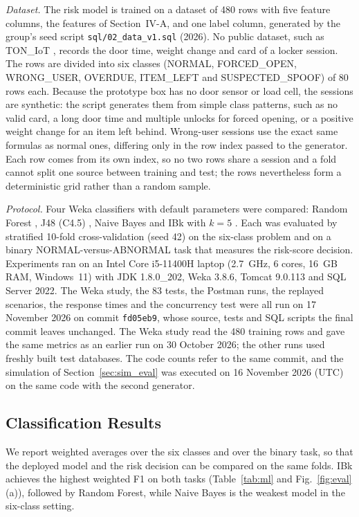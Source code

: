 \documentclass[journal,onecolumn]{IEEEtran}
\newcommand{\revisioncommit}{fd05eb9}
\begin{document}
\textit{Dataset.} The risk model is trained on a dataset of 480 rows with five feature columns, the features of
Section~IV-A, and one label column, generated by the group's seed script \texttt{sql/02\_data\_v1.sql} (2026). No
public dataset, such as TON\_IoT \cite{moustafa2021toniot}, records the door time, weight change and card of a locker
session. The rows are divided into six classes (NORMAL, FORCED\_OPEN,
WRONG\_USER, OVERDUE, ITEM\_LEFT and SUSPECTED\_SPOOF) of 80 rows each. Because the prototype box has no door sensor or
load cell, the sessions are synthetic: the script generates them from simple class patterns, such as no valid card, a
long door time and multiple unlocks for forced opening, or a positive weight change for an item left behind. Wrong-user
sessions use the exact same formulas as normal ones, differing only in the row index passed to the generator. Each
row comes from its own index, so no two rows share a session and a fold cannot split one source between training and
test; the rows nevertheless form a deterministic grid rather than a random sample.

\textit{Protocol.} Four Weka classifiers with default parameters were compared: Random Forest \cite{breiman2001rf},
J48 (C4.5) \cite{quinlan1993c45}, Naive Bayes \cite{john1995nb} and IBk with $k = 5$ \cite{aha1991ibl}. Each was
evaluated by stratified 10-fold cross-validation \cite{kohavi1995cv} (seed 42) on the six-class problem and on a binary
NORMAL-versus-ABNORMAL task that measures the risk-score decision. Experiments ran on an Intel
Core i5-11400H laptop (2.7~GHz, 6 cores, 16~GB RAM, Windows~11) with JDK 1.8.0\_202, Weka 3.8.6, Tomcat 9.0.113 and SQL
Server 2022. The Weka study, the 83 tests, the Postman runs, the replayed scenarios, the response times and the
concurrency test were all run on 17 November 2026 on commit \texttt{\revisioncommit}, whose source, tests and SQL scripts
the final commit leaves unchanged. The Weka study read the 480 training rows and gave the same metrics as an earlier run
on 30 October 2026; the other runs used freshly built test databases.
The code counts refer to the same commit, and the simulation of Section~\ref{sec:sim_eval} was executed on
16 November 2026 (UTC) on the same code with the second generator.

\subsection{Classification Results}

We report weighted averages over the six classes and over the binary task, so that the deployed model and the risk
decision can be compared on the same folds. IBk achieves the highest weighted F1 on both tasks (Table~\ref{tab:ml} and
Fig.~\ref{fig:eval}(a)), followed by Random Forest, while Naive Bayes is the weakest model in the six-class setting.
\end{document}
